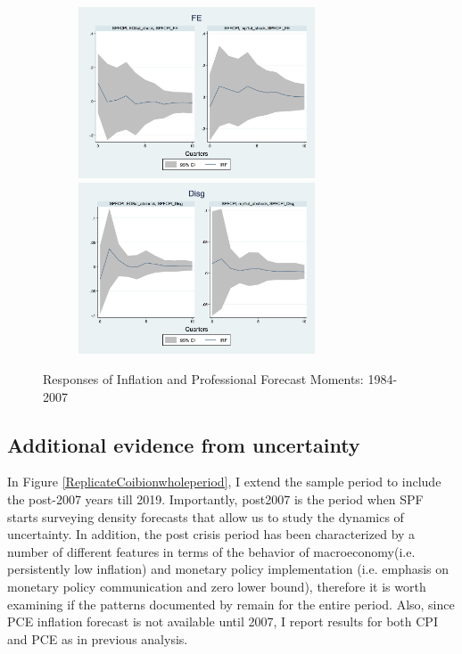 \documentclass[12pt]{article}
\begin{document}
\begin{figure}[ht]
\begin{subfigure}[b]{0.5\textwidth}
		\smallskip
		\includegraphics[width=7cm]{figures/SPFFE_ashocks_before2007.png} 
		\smallskip
		\includegraphics[width=7cm]{figures/SPFDisg_ab_ashocks_before2007.png} 
	\end{subfigure}
	\caption{Responses of Inflation and Professional Forecast Moments: 1984-2007}
	\label{ReplicateCoibionBefore2007}
\end{figure}

	
	\subsection{Additional evidence from uncertainty}
	
	In Figure \ref{ReplicateCoibionwholeperiod}, I extend the sample period to include the post-2007 years till 2019. Importantly, post2007 is the period when SPF starts surveying density forecasts that allow us to study the dynamics of uncertainty. In addition, the post crisis period has been characterized by a number of different features in terms of the behavior of macroeconomy(i.e. persistently low inflation) and monetary policy implementation (i.e. emphasis on monetary policy communication and zero lower bound), therefore it is worth examining if the patterns documented by \cite{coibion2012can} remain for the entire period. Also, since PCE inflation forecast is not available until 2007, I report results for both CPI and PCE as in previous analysis. 
	
\end{document}

